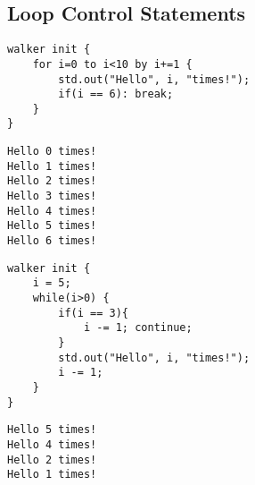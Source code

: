 \subsection*{Loop Control Statements}
\begin{description}
    \begin{lstlisting}[caption={\texttt{break} statement}]
walker init {
    for i=0 to i<10 by i+=1 {
        std.out("Hello", i, "times!");
        if(i == 6): break;
    }
}
    \end{lstlisting}
    \item[Output] \texttt{}
          \begin{lstlisting}[language=shell]
Hello 0 times!
Hello 1 times!
Hello 2 times!
Hello 3 times!
Hello 4 times!
Hello 5 times!
Hello 6 times!
        \end{lstlisting}
    \item[Description] \texttt{}
\end{description}

\begin{description}
    \begin{lstlisting}[caption={\texttt{continue} statement}]
walker init {
    i = 5;
    while(i>0) {
        if(i == 3){
            i -= 1; continue;
        }
        std.out("Hello", i, "times!");
        i -= 1;
    }
}
    \end{lstlisting}
    \item[Output] \texttt{}
          \begin{lstlisting}[language=shell]
Hello 5 times!
Hello 4 times!
Hello 2 times!
Hello 1 times!
        \end{lstlisting}
    \item[Description] \texttt{}
\end{description}